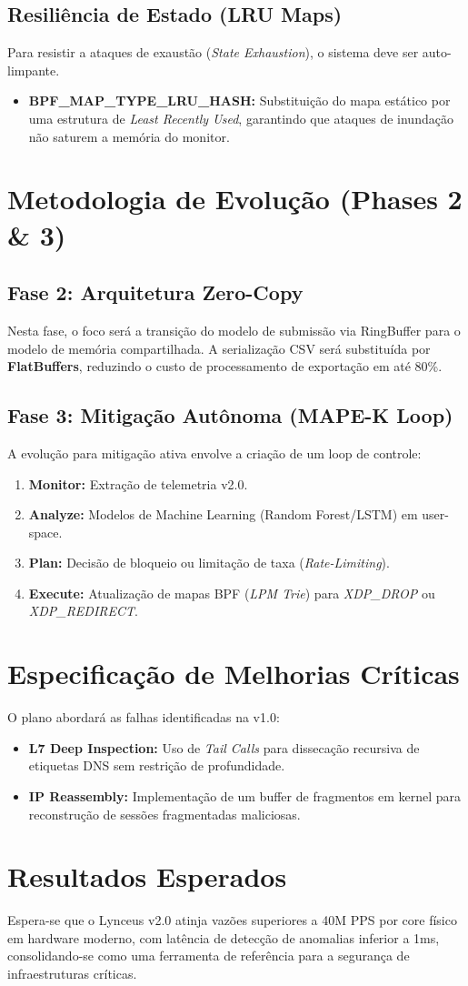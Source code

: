 \documentclass[a4paper,12pt]{article}
\begin{document}
\subsection{Resiliência de Estado (LRU Maps)}
Para resistir a ataques de exaustão (\textit{State Exhaustion}), o sistema deve ser auto-limpante.
\begin{itemize}
    \item \textbf{BPF\_MAP\_TYPE\_LRU\_HASH:} Substituição do mapa estático por uma estrutura de \textit{Least Recently Used}, garantindo que ataques de inundação não saturem a memória do monitor.
\end{itemize}

\section{Metodologia de Evolução (Phases 2 \& 3)}

\subsection{Fase 2: Arquitetura Zero-Copy}
Nesta fase, o foco será a transição do modelo de submissão via RingBuffer para o modelo de memória compartilhada. A serialização CSV será substituída por \textbf{FlatBuffers}, reduzindo o custo de processamento de exportação em até 80\%.

\subsection{Fase 3: Mitigação Autônoma (MAPE-K Loop)}
A evolução para mitigação ativa envolve a criação de um loop de controle:
\begin{enumerate}
    \item \textbf{Monitor:} Extração de telemetria v2.0.
    \item \textbf{Analyze:} Modelos de Machine Learning (Random Forest/LSTM) em user-space.
    \item \textbf{Plan:} Decisão de bloqueio ou limitação de taxa (\textit{Rate-Limiting}).
    \item \textbf{Execute:} Atualização de mapas BPF (\textit{LPM Trie}) para \textit{XDP\_DROP} ou \textit{XDP\_REDIRECT}.
\end{enumerate}

\section{Especificação de Melhorias Críticas}
O plano abordará as falhas identificadas na v1.0:
\begin{itemize}
    \item \textbf{L7 Deep Inspection:} Uso de \textit{Tail Calls} para dissecação recursiva de etiquetas DNS sem restrição de profundidade.
    \item \textbf{IP Reassembly:} Implementação de um buffer de fragmentos em kernel para reconstrução de sessões fragmentadas maliciosas.
\end{itemize}

\section{Resultados Esperados}
Espera-se que o Lynceus v2.0 atinja vazões superiores a 40M PPS por core físico em hardware moderno, com latência de detecção de anomalias inferior a 1ms, consolidando-se como uma ferramenta de referência para a segurança de infraestruturas críticas.
\end{document}
